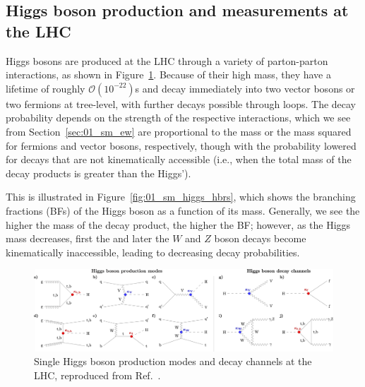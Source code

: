 

\subsection{Higgs boson production and measurements at the LHC}

Higgs bosons are produced at the LHC through a variety of parton-parton interactions, as shown in Figure~\ref{fig:01_sm_higgs_production}.
Because of their high mass, they have a lifetime of roughly $\mathcal O(10^{-22})$s and decay immediately into two vector bosons or two fermions at tree-level, with further decays possible through loops.
The decay probability depends on the strength of the respective interactions, which we see from Section~\ref{sec:01_sm_ew} are proportional to the mass or the mass squared for fermions and vector bosons, respectively, though with the probability lowered for decays that are not kinematically accessible (i.e., when the total mass of the decay products is greater than the Higgs').

This is illustrated in Figure~\ref{fig:01_sm_higgs_hbrs}, which shows the branching fractions (BFs) of the Higgs boson as a function of its mass.
Generally, we see the higher the mass of the decay product, the higher the BF; however, as the Higgs mass decreases, first the \ttbar and later the $W$ and $Z$ boson decays become kinematically inaccessible, leading to decreasing decay probabilities.

\begin{figure}[ht]
	\centering
	\includegraphics[width=\textwidth]{figures/01-SM-03-SM/higgs/higgs_production.png}
	\caption{Single Higgs boson production modes and decay channels at the LHC, reproduced from Ref.~\cite{CMS:2022dwd}.}
	\label{fig:01_sm_higgs_production}
\end{figure}

